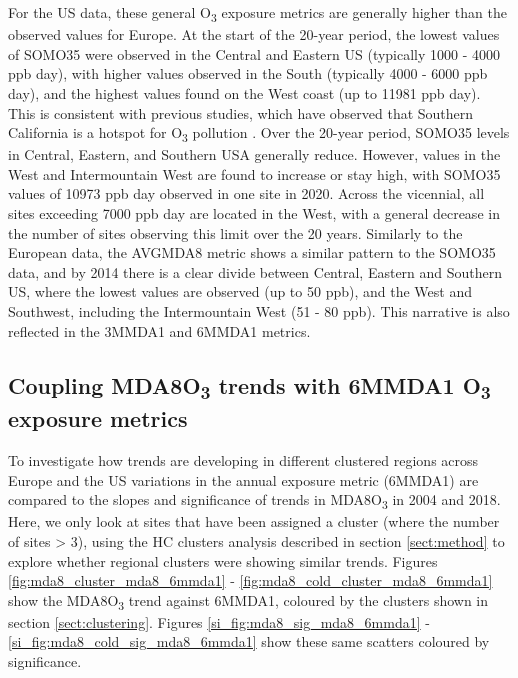 \documentclass[journal abbreviation, manuscript]{copernicus}
\begin{document}
For the US data, these general O\textsubscript{3} exposure metrics are generally higher than the observed values for Europe. At the start of the 20-year period, the lowest values of SOMO35 were observed in the Central and Eastern US (typically 1000 - 4000 ppb day), with higher values observed in the South (typically 4000 - 6000 ppb day), and the highest values found on the West coast (up to 11981 ppb day). This is consistent with previous studies, which have observed that Southern California is a hotspot for O\textsubscript{3} pollution \citep{fleming_2018, WangKeding2024}. Over the 20-year period, SOMO35 levels in Central, Eastern, and Southern USA generally reduce. However, values in the West and Intermountain West are found to increase or stay high, with SOMO35 values of 10973 ppb day observed in one site in 2020. Across the vicennial, all sites exceeding 7000 ppb day are located in the West, with a general decrease in the number of sites observing this limit over the 20 years. Similarly to the European data, the AVGMDA8 metric shows a similar pattern to the SOMO35 data, and by 2014 there is a clear divide between Central, Eastern and Southern US, where the lowest values are observed (up to 50 ppb), and the West and Southwest, including the Intermountain West (51 - 80 ppb). This narrative is also reflected in the 3MMDA1 and 6MMDA1 metrics.

\subsection{Coupling MDA8O\textsubscript{3} trends with 6MMDA1 O\textsubscript{3} exposure metrics} \label{sect:polluted_stuff}

To investigate how trends are developing in different clustered regions across Europe and the US variations in the annual exposure metric (6MMDA1) are compared to the slopes and significance of trends in MDA8O\textsubscript{3} in 2004 and 2018. Here, we only look at sites that have been assigned a cluster (where the number of sites > 3), using the HC clusters analysis described in section \ref{sect:method} to explore whether regional clusters were showing similar trends. Figures \ref{fig:mda8_cluster_mda8_6mmda1} - \ref{fig:mda8_cold_cluster_mda8_6mmda1} show the MDA8O\textsubscript{3} trend against 6MMDA1, coloured by the clusters shown in section \ref{sect:clustering}. Figures \ref{si_fig:mda8_sig_mda8_6mmda1} - \ref{si_fig:mda8_cold_sig_mda8_6mmda1} show these same scatters coloured by significance.
\end{document}
